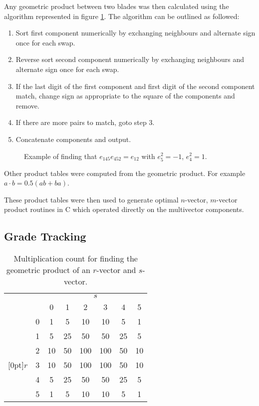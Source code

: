 Any geometric product between two blades was then calculated using the algorithm
represented in figure \ref{fig:symbolic}. The algorithm 
can be outlined as followed:

\begin{enumerate}
\item Sort first component numerically by exchanging neighbours and alternate sign
once for each swap.
\item Reverse sort second component numerically by exchanging neighbours and alternate sign
once for each swap.
\item If the last digit of the first component and first digit of the second
component match, change sign as appropriate to the square of the components and
remove.
\item If there are more pairs to match, goto step 3.
\item Concatenate components and output.
\end{enumerate}

\begin{figure}
\centering
{}
\caption{Example of finding that $e_{145}e_{452} = e_{12}$ with $e_5^2 = -1$, $e_4^2 = 1$.
\label{fig:symbolic}}
\end{figure}

Other product tables were computed from the geometric product. For example 
$a \cdot b = 0.5 (ab + ba)$.

These product tables were then used to generate optimal $n$-vector, $m$-vector product 
routines in C which operated directly on the multivector components.


\subsection{Grade Tracking}
\label{sec:grade_tracking}

\begin{table}
\centering
\begin{tabular}{cc|cccccc}
 \multicolumn{2}{c}{} & \multicolumn{6}{c}{$s$} \\
&  & 0 & 1 & 2 & 3 & 4 & 5 \\
\cline{2-8}
& 0 & 1 & 5 &10 &10 & 5 & 1 \\
& 1 & 5 & 25&50 &50 &25 & 5\\
& 2 & 10& 50&100&100&50 & 10\\
\raisebox{1.5ex}[0pt]{$r$} & 3 & 10& 50&100&100&50 & 10\\
& 4 & 5 & 25&50 &50 &25 & 5\\
& 5 & 1 & 5 &10 &10 & 5 & 1
\end{tabular}
\caption{Multiplication count for finding the geometric product of an
$r$-vector and $s$-vector.
\label{tab:grades}}
\end{table}

